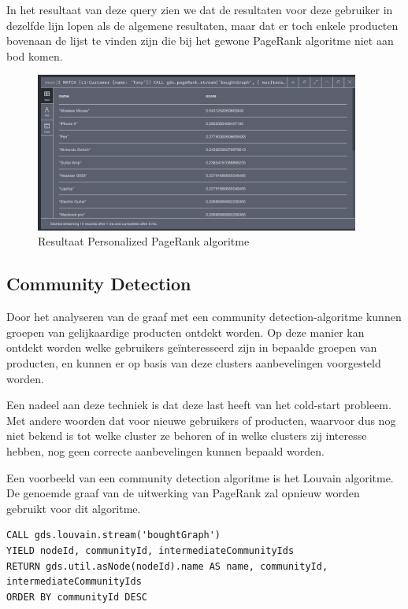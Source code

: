 In het resultaat van deze query zien we dat de resultaten voor deze gebruiker in dezelfde lijn lopen als de algemene resultaten, maar dat er toch enkele producten bovenaan de lijst te vinden zijn die bij het gewone PageRank algoritme niet aan bod komen.

\begin{figure} [ht]
	\centering
	\includegraphics[width=0.95\textwidth]{img/persPageRank_res_1}
	\caption{Resultaat Personalized PageRank algoritme}
	\label{fig:personalizedPageRankResult}
\end{figure}

\subsection{Community Detection}
\label{subsec: Community Detection}

Door het analyseren van de graaf met een community detection-algoritme kunnen groepen van gelijkaardige producten ontdekt worden. Op deze manier kan ontdekt worden welke gebruikers geïnteresseerd zijn in bepaalde groepen van producten, en kunnen er op basis van deze clusters aanbevelingen voorgesteld worden. 

Een nadeel aan deze techniek is dat deze last heeft van het cold-start probleem. Met andere woorden dat voor nieuwe gebruikers of producten, waarvoor dus nog niet bekend is tot welke cluster ze behoren of in welke clusters zij interesse hebben, nog geen correcte aanbevelingen kunnen bepaald worden.

Een voorbeeld van een community detection algoritme is het Louvain algoritme. De genoemde graaf van de uitwerking van PageRank zal opnieuw worden gebruikt voor dit algoritme.

\begin{lstlisting}[caption={ Louvain algoritme }]
CALL gds.louvain.stream('boughtGraph')
YIELD nodeId, communityId, intermediateCommunityIds
RETURN gds.util.asNode(nodeId).name AS name, communityId, intermediateCommunityIds
ORDER BY communityId DESC
\end{lstlisting}

